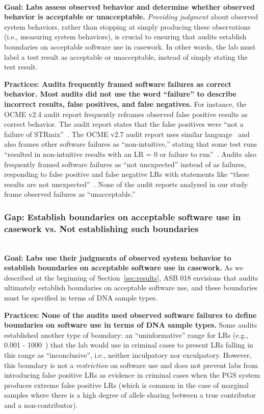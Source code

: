 \textbf{\\Goal: Labs assess observed behavior and determine whether observed behavior is acceptable or unacceptable.} \textit{Providing judgment} about observed system behaviors, rather than stopping at simply producing these observations (i.e., measuring system behaviors), is crucial to ensuring that audits establish boundaries on acceptable software use in casework. In other words, the lab must label a test result as acceptable or unacceptable, instead of simply stating the test result. 


\textbf{Practices:  Audits frequently framed software failures as correct behavior. Most audits did not use the word ``failure'' to describe incorrect results, false positives, and false negatives.} For instance, the OCME v2.4 audit report frequently reframes observed false positive results as correct behavior. The audit report states that the false positives were ``not a failure of STRmix''~\cite[p. 13]{ocmeIV}. The OCME v2.7 audit report uses similar language~\cite[p. 24]{ocmeIV2.7} and also frames other software failures as ``non-intuitive,'' stating that some test runs ``resulted in non-intuitive results with an LR = 0 or failure to run''~\cite[p.14]{ocmeIV2.7}. Audits also frequently framed software failures as ``not unexpected'' instead of as failures, responding to false positive and false negative LRs with statements like ``these results are not unexpected''~\cite[p.24]{ocmeIV2.7}. None of the audit reports analyzed in our study frame observed failures as ``unacceptable.'' 


\subsubsection{Gap: Establish boundaries on acceptable software use in casework vs. Not establishing such boundaries}
\label{sec:judgement-gap2}
\textbf{\\Goal: Labs use their judgments of observed system behavior to establish boundaries on acceptable software use in casework.} As we described at the beginning of Section~\ref{sec:results}, ASB 018 envisions that audits ultimately establish boundaries on acceptable software use, and these boundaries must be specified in terms of DNA sample types.  
  

\textbf{Practices: }\textbf{None of the audits used observed software failures to define boundaries on software use in terms of DNA sample types.} Some audits established another type of boundary: an ``uninformative'' range for LRs (e.g., 0.001 - 1000~\cite[p.24]{ocmeIV2.7}) that the lab would use in criminal cases to present LRs falling in this range as ``inconclusive'', i.e., neither inculpatory nor exculpatory. However, this boundary is not a \textit{restriction} on software use and does not prevent labs from introducing false positive LRs as evidence in criminal cases when the PGS system produces extreme false positive LRs (which is common in the case of marginal samples where there is a high degree of allele sharing between a true contributor and a non-contributor).  



